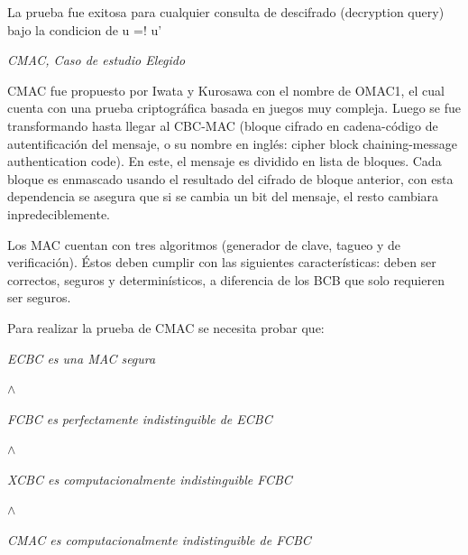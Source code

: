 \documentclass[runningheads,a4paper]{llncs}
\begin{document}
La prueba fue exitosa para cualquier consulta de descifrado (decryption query) bajo la condicion de u =! u'\cite{article3}

\centerline{\emph{CMAC, Caso de estudio Elegido}}
CMAC fue propuesto por Iwata y Kurosawa con el nombre de OMAC1, el cual cuenta con una prueba criptográfica basada en juegos muy compleja. Luego se fue transformando hasta llegar al CBC-MAC (bloque cifrado en cadena-código de autentificación del mensaje, o su nombre en inglés: cipher block chaining-message authentication code). En este, el mensaje es dividido en lista de bloques. Cada bloque es enmascado usando el resultado del cifrado de bloque anterior, con esta dependencia se asegura que si se cambia un bit  del mensaje, el resto cambiara inpredeciblemente.

Los MAC cuentan con tres algoritmos (generador de clave, tagueo y de verificación). Éstos deben cumplir con las siguientes características: deben ser correctos, seguros y determinísticos, a diferencia de los BCB que solo requieren ser seguros.

Para realizar la prueba de CMAC se necesita probar que:

\centerline{\emph{ECBC es una MAC segura}}
\centerline{$\land$}
\centerline{\emph{FCBC es perfectamente indistinguible de ECBC}}
\centerline{$\land$}
\centerline{\emph{XCBC es computacionalmente indistinguible FCBC}}
\centerline{$\land$}
\centerline{\emph{CMAC es computacionalmente indistinguible de FCBC}}
\end{document}
